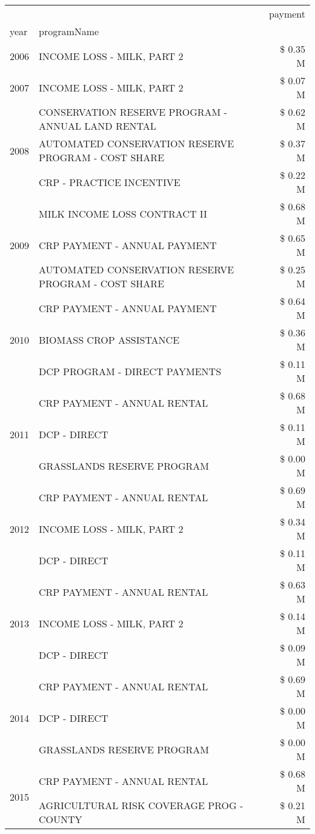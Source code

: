 \begin{tabular}{llr}
\toprule
 &  & payment \\
year & programName &  \\
\midrule
2006 & INCOME LOSS - MILK, PART 2 & \$ 0.35 M \\
\cline{1-3}
2007 & INCOME LOSS - MILK, PART 2 & \$ 0.07 M \\
\cline{1-3}
\multirow[t]{3}{*}{2008} & CONSERVATION RESERVE PROGRAM - ANNUAL LAND RENTAL & \$ 0.62 M \\
 & AUTOMATED CONSERVATION RESERVE PROGRAM - COST SHARE & \$ 0.37 M \\
 & CRP - PRACTICE INCENTIVE & \$ 0.22 M \\
\cline{1-3}
\multirow[t]{3}{*}{2009} & MILK INCOME LOSS CONTRACT II & \$ 0.68 M \\
 & CRP PAYMENT - ANNUAL PAYMENT & \$ 0.65 M \\
 & AUTOMATED CONSERVATION RESERVE PROGRAM - COST SHARE & \$ 0.25 M \\
\cline{1-3}
\multirow[t]{3}{*}{2010} & CRP PAYMENT - ANNUAL PAYMENT & \$ 0.64 M \\
 & BIOMASS CROP ASSISTANCE & \$ 0.36 M \\
 & DCP PROGRAM - DIRECT PAYMENTS & \$ 0.11 M \\
\cline{1-3}
\multirow[t]{3}{*}{2011} & CRP PAYMENT - ANNUAL RENTAL & \$ 0.68 M \\
 & DCP - DIRECT & \$ 0.11 M \\
 & GRASSLANDS RESERVE PROGRAM & \$ 0.00 M \\
\cline{1-3}
\multirow[t]{3}{*}{2012} & CRP PAYMENT - ANNUAL RENTAL & \$ 0.69 M \\
 & INCOME LOSS - MILK, PART 2 & \$ 0.34 M \\
 & DCP - DIRECT & \$ 0.11 M \\
\cline{1-3}
\multirow[t]{3}{*}{2013} & CRP PAYMENT - ANNUAL RENTAL & \$ 0.63 M \\
 & INCOME LOSS - MILK, PART 2 & \$ 0.14 M \\
 & DCP - DIRECT & \$ 0.09 M \\
\cline{1-3}
\multirow[t]{3}{*}{2014} & CRP PAYMENT - ANNUAL RENTAL & \$ 0.69 M \\
 & DCP - DIRECT & \$ 0.00 M \\
 & GRASSLANDS RESERVE PROGRAM & \$ 0.00 M \\
\cline{1-3}
\multirow[t]{2}{*}{2015} & CRP PAYMENT - ANNUAL RENTAL & \$ 0.68 M \\
 & AGRICULTURAL RISK COVERAGE PROG - COUNTY & \$ 0.21 M \\

\end{tabular}
